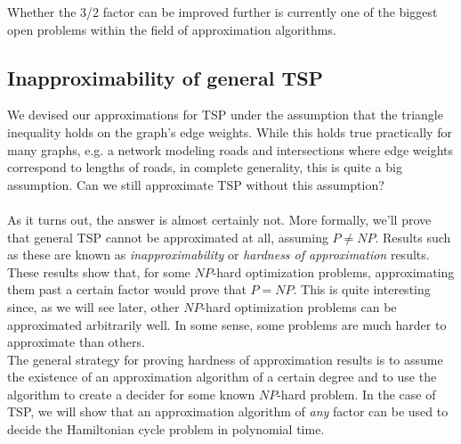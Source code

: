 \documentclass{article}
\begin{document}
\noindent Whether the 3/2 factor can be improved further is currently one of the biggest open problems within the field of approximation algorithms.

\subsection{Inapproximability of general TSP}

We devised our approximations for TSP under the assumption that the triangle inequality holds on the graph's edge weights. While this holds true practically for many graphs, e.g. a network modeling roads and intersections where edge weights correspond to lengths of roads, in complete generality, this is quite a big assumption. Can we still approximate TSP without this assumption?\\
\\
As it turns out, the answer is almost certainly not. More formally, we'll prove that general TSP cannot be approximated at all, assuming $P \neq NP$. Results such as these are known as \textit{inapproximability} or \textit{hardness of approximation} results. These results show that, for some $NP$-hard optimization problems, approximating them past a certain factor would prove that $P = NP$. This is quite interesting since, as we will see later, other $NP$-hard optimization problems can be approximated arbitrarily well. In some sense, some problems are much harder to approximate than others.\\
The general strategy for proving hardness of approximation results is to assume the existence of an approximation algorithm of a certain degree and to use the algorithm to create a decider for some known $NP$-hard problem. In the case of TSP, we will show that an approximation algorithm of \textit{any} factor can be used to decide the Hamiltonian cycle problem in polynomial time.
\end{document}
